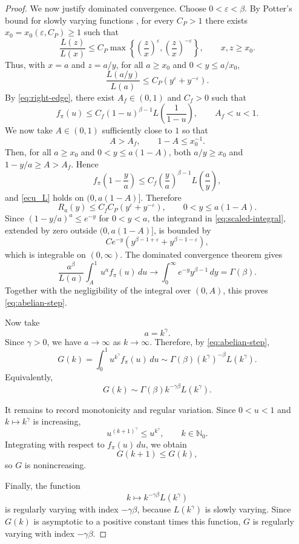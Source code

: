 \documentclass[reqno,final,11pt]{amsart}
\newcommand{\Nzero}{\mathbb N_0}
\newcommand{\dd}{\,d}
\theoremstyle{plain}
\theoremstyle{definition}
\theoremstyle{remark}
\numberwithin{equation}{section}
\begin{document}
\begin{proof}
We now justify dominated convergence. Choose \(0<\varepsilon<\beta\).
By Potter’s bound for slowly varying functions
\cite[Theorem~1.5.6]{BinghamGoldieTeugels1987}, for every \(C_P>1\)
there exists \(x_0=x_0(\varepsilon,C_P)\ge1\) such that
\[
  \frac{L(z)}{L(x)}
  \le
  C_P
  \max\left\{
    \left(\frac{z}{x}\right)^\varepsilon,
    \left(\frac{z}{x}\right)^{-\varepsilon}
  \right\},
  \qquad x,z\ge x_0.
\]
Thus, with \(x=a\) and \(z=a/y\), for all \(a\ge x_0\) and
\(0<y\le a/x_0\),
\begin{equation}\label{ecu_L}
  \frac{L(a/y)}{L(a)}
  \le
  C_P\left(y^\varepsilon+y^{-\varepsilon}\right).
\end{equation}
By \eqref{eq:right-edge}, there exist \(A_f\in(0,1)\) and \(C_f>0\)
such that
\[
  f_\pi(u)
  \le
  C_f(1-u)^{\beta-1}
  L\left(\frac1{1-u}\right),
  \qquad A_f<u<1.
\]
We now take \(A\in(0,1)\) sufficiently close to \(1\) so that
\[
  A>A_f,
  \qquad
  1-A\le x_0^{-1}.
\]
Then, for all \(a\ge x_0\) and \(0<y\le a(1-A)\), both
\(a/y\ge x_0\) and \(1-y/a\ge A>A_f\). Hence
\[
  f_\pi\left(1-\frac ya\right)
  \le
  C_f\left(\frac ya\right)^{\beta-1}L\left(\frac ay\right),
\]
and \eqref{ecu_L} holds on \((0,a(1-A)]\). Therefore
\[
  R_a(y)
  \le
  C_fC_P\left(y^\varepsilon+y^{-\varepsilon}\right),
  \qquad 0<y\le a(1-A).
\]
Since \((1-y/a)^a\le e^{-y}\) for \(0<y<a\), the integrand in
\eqref{eq:scaled-integral}, extended by zero outside \((0,a(1-A)]\), is
bounded by
\[
C e^{-y}
  \left(y^{\beta-1+\varepsilon}+y^{\beta-1-\varepsilon}\right),
\]
which is integrable on \((0,\infty)\). The dominated convergence theorem gives
\[
  \frac{a^\beta}{L(a)}
  \int_A^1 u^a f_\pi(u)\,du
  \longrightarrow
  \int_0^\infty e^{-y}y^{\beta-1}\,dy
  =
  \Gamma(\beta).
\]
Together with the negligibility of the integral over \((0,A)\), this proves
\eqref{eq:abelian-step}.

Now take
\[
  a=k^\gamma.
\]
Since \(\gamma>0\), we have \(a\to\infty\) as \(k\to\infty\). Therefore, by
\eqref{eq:abelian-step},
\[
  G(k)
  =
  \int_0^1 u^{k^\gamma}f_\pi(u)\dd u
  \sim
  \Gamma(\beta)(k^\gamma)^{-\beta}L(k^\gamma).
\]
Equivalently,
\[
  G(k)
  \sim
  \Gamma(\beta)k^{-\gamma\beta}L(k^\gamma).
\]

It remains to record monotonicity and regular variation. Since \(0<u<1\) and
\(k\mapsto k^\gamma\) is increasing,
\[
  u^{(k+1)^\gamma}\le u^{k^\gamma},
  \qquad k\in\Nzero.
\]
Integrating with respect to \(f_\pi(u)\dd u\), we obtain
\[
  G(k+1)\le G(k),
\]
so \(G\) is nonincreasing.

Finally, the function
\[
  k\mapsto k^{-\gamma\beta}L(k^\gamma)
\]
is regularly varying with index \(-\gamma\beta\), because \(L(k^\gamma)\) is
slowly varying. Since \(G(k)\) is asymptotic to a positive constant times this
function, \(G\) is regularly varying with index \(-\gamma\beta\).
\end{proof}
\end{document}
